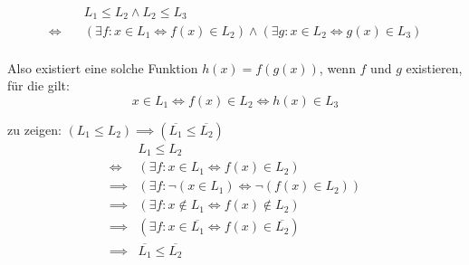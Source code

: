 \begin{align*}
	&L_1 \leq L_2 \wedge L_2 \leq L_3 \\
	\iff \quad &(\exists f: x \in L_1 \iff f(x) \in L_2) \land
		(\exists g: x \in L_2 \iff g(x) \in L_3)\\
\end{align*}

Also existiert eine solche Funktion $h(x)=f(g(x))$, wenn $f$ und $g$ existieren,
für die gilt:
\[
x \in L_1 \iff f(x) \in L_2 \iff h(x) \in L_3
\]

zu zeigen: \quad$(L_1 \leq L_2) \implies (\overline{L_1} \leq \overline{L_2})$
\begin{align*}
	&L_1 \leq L_2\\
	\iff &(\exists f: x \in L_1 \iff f(x) \in L_2)\\
	\implies &(\exists f: \neg (x \in L_1) \iff \neg (f(x) \in L_2))\\
	\implies &(\exists f: x \notin L_1 \iff f(x) \notin L_2)\\
	\implies &(\exists f: x \in \overline{L_1} \iff f(x) \in \overline{L_2})\\
	\implies &\overline{L_1} \leq \overline{L_2}
\end{align*}
